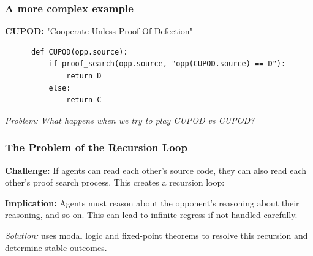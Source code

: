 \documentclass[t,11pt]{beamer}
\begin{document}
\begin{frame}[fragile]
  \frametitle{A more complex example}
  \textbf{CUPOD:} "Cooperate Unless Proof Of Defection"

  \begin{center}
    \begin{lstlisting}
      def CUPOD(opp.source):
          if proof_search(opp.source, "opp(CUPOD.source) == D"):
              return D
          else:
              return C
    \end{lstlisting}
  \end{center}

  \vspace{0.5cm}

  \vspace{0.3cm}
  \textit{Problem: What happens when we try to play CUPOD vs CUPOD?}
\end{frame}

\begin{frame}[fragile]
  \frametitle{The Problem of the Recursion Loop}

  \textbf{Challenge:} If agents can read each other's source code, they can also read each other's proof search process. This creates a recursion loop:
\begin{center}
\end{center}
  \vspace{0.3cm}
  \textbf{Implication:} Agents must reason about the opponent's reasoning about their reasoning, and so on. This can lead to infinite regress if not handled carefully.

  \vspace{0.3cm}

  \textit{Solution:} \cite{critch2022cooperativeuncooperativeinstitutiondesigns} uses modal logic and fixed-point theorems to resolve this recursion and determine stable outcomes. 
\end{frame}
\end{document}
